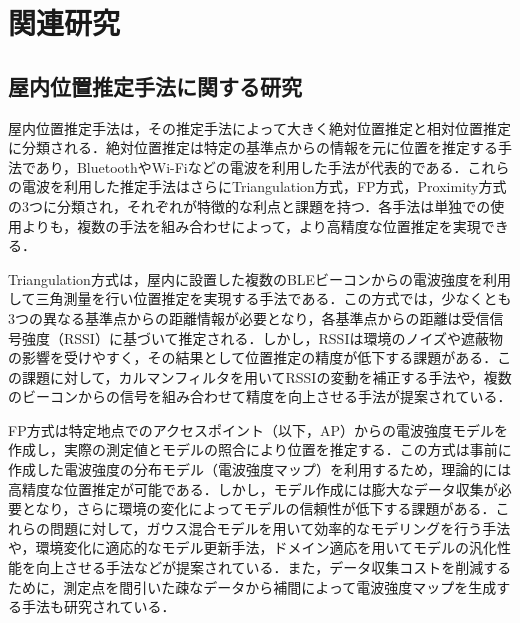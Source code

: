 


\chapter{関連研究}



\section{屋内位置推定手法に関する研究}

屋内位置推定手法は，その推定手法によって大きく絶対位置推定と相対位置推定に分類される．絶対位置推定は特定の基準点からの情報を元に位置を推定する手法であり，BluetoothやWi-Fiなどの電波を利用した手法が代表的である．これらの電波を利用した推定手法はさらにTriangulation方式，FP方式，Proximity方式の3つに分類され\cite{wireless-lan-summary}，それぞれが特徴的な利点と課題を持つ．各手法は単独での使用よりも，複数の手法を組み合わせによって，より高精度な位置推定を実現できる．

Triangulation方式は，屋内に設置した複数のBLEビーコンからの電波強度を利用して三角測量を行い位置推定を実現する手法である．この方式では，少なくとも3つの異なる基準点からの距離情報が必要となり，各基準点からの距離は受信信号強度（RSSI）に基づいて推定される\cite{ble-indoor}．しかし，RSSIは環境のノイズや遮蔽物の影響を受けやすく，その結果として位置推定の精度が低下する課題がある．この課題に対して，カルマンフィルタを用いてRSSIの変動を補正する手法\cite{triangulation-kalman}や，複数のビーコンからの信号を組み合わせて精度を向上させる手法\cite{ble-tandem}が提案されている．

FP方式は特定地点でのアクセスポイント（以下，AP）からの電波強度モデルを作成し，実際の測定値とモデルの照合により位置を推定する．この方式は事前に作成した電波強度の分布モデル（電波強度マップ）を利用するため，理論的には高精度な位置推定が可能である．しかし，モデル作成には膨大なデータ収集が必要となり，さらに環境の変化によってモデルの信頼性が低下する課題がある．これらの問題に対して，ガウス混合モデルを用いて効率的なモデリングを行う手法\cite{gaussian-mixture-model}や，環境変化に適応的なモデル更新手法\cite{fingerprint-auto-update}，ドメイン適応を用いてモデルの汎化性能を向上させる手法\cite{wi-fi-fingerprint-domain}などが提案されている．また，データ収集コストを削減するために，測定点を間引いた疎なデータから補間によって電波強度マップを生成する手法\cite{wireless-lan-cost-reduction}も研究されている．


